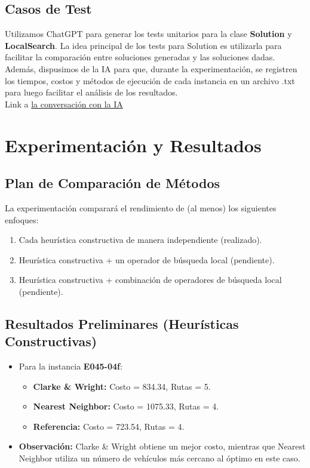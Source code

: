 \documentclass[a4paper,12pt]{article}
\begin{document}
\subsection{Casos de Test}
Utilizamos ChatGPT para generar los tests unitarios para la clase \textbf{Solution} y \textbf{LocalSearch}. La idea principal de los tests para Solution es utilizarla para facilitar la comparación entre soluciones generadas y las soluciones dadas.
Además, dispusimos de la IA para que, durante la experimentación, se registren los tiempos, costos y métodos de ejecución de cada instancia en un archivo .txt para luego facilitar el análisis de los resultados.
\\ Link a \href{https://chatgpt.com/share/686d64a3-2a98-800f-a08d-ffff11d47fe8}{la conversación con la IA}

\section{Experimentación y Resultados}

\subsection{Plan de Comparación de Métodos}
La experimentación comparará el rendimiento de (al menos) los siguientes enfoques:
\begin{enumerate}
    \item Cada heurística constructiva de manera independiente (realizado).
    \item Heurística constructiva + un operador de búsqueda local (pendiente).
    \item Heurística constructiva + combinación de operadores de búsqueda local (pendiente).
\end{enumerate}

\subsection{Resultados Preliminares (Heurísticas Constructivas)}
\begin{itemize}
    \item Para la instancia \textbf{E045-04f}:
    \begin{itemize}
        \item \textbf{Clarke \& Wright:} Costo = 834.34, Rutas = 5.
        \item \textbf{Nearest Neighbor:} Costo = 1075.33, Rutas = 4.
        \item \textbf{Referencia:} Costo = 723.54, Rutas = 4.
    \end{itemize}
    \item \textbf{Observación:} Clarke \& Wright obtiene un mejor costo, mientras que Nearest Neighbor utiliza un número de vehículos más cercano al óptimo en este caso.
\end{itemize}
\end{document}
